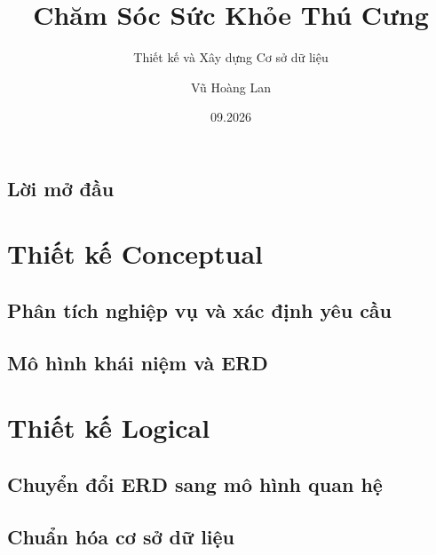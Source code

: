 \documentclass[letterpaper,11pt,leqno]{book}
\begin{document}
\title{Chăm Sóc Sức Khỏe Thú Cưng}

\subtitle{Thiết kế và Xây dựng Cơ sở dữ liệu}

\author{Vũ Hoàng Lan}

\date{09.2026}

\begin{titlepage}
\maketitle
\end{titlepage}

\frontmatter
\tableofcontents
\listoftables
\listoffigures
\chapter{Lời mở đầu}


\mainmatter

\part{Thiết kế Conceptual}\label{p:conceptual}

\chapter{Phân tích nghiệp vụ và xác định yêu cầu}\label{c:requirements}


\chapter{Mô hình khái niệm và ERD}\label{c:conceptual}


\part{Thiết kế Logical}\label{p:logical}

\chapter{Chuyển đổi ERD sang mô hình quan hệ}\label{c:logical}


\chapter{Chuẩn hóa cơ sở dữ liệu}\label{c:normalization}

\end{document}
